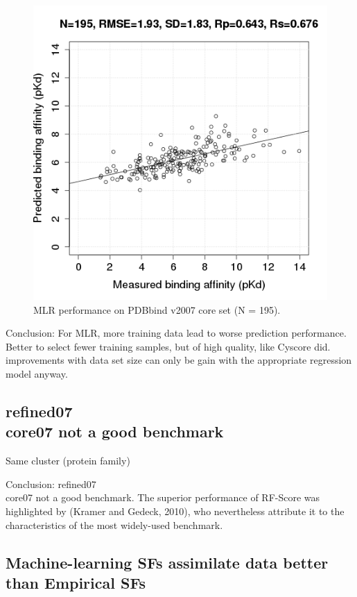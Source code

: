 \documentclass[journal=jacsat,manuscript=article]{achemso}
\begin{document}
\begin{figure}
\endminipage\hfill
{}%
\includegraphics[width=1.4\linewidth,natwidth=480,natheight=480]{../rfcyscore/x4/mlr/trn-2280-tst-195-yp.png}
\endminipage
\caption{MLR performance on PDBbind v2007 core set (N = 195).}
\label{fig:mlr-tst-195}
\end{figure}

Conclusion: For MLR, more training data lead to worse prediction performance. Better to select fewer training samples, but of high quality, like Cyscore did.
improvements with data set size can only be gain with the appropriate regression model anyway.

\subsection{refined07\\core07 not a good benchmark}

Same cluster (protein family)

Conclusion: refined07\\core07 not a good benchmark.
The superior performance of RF-Score was highlighted by (Kramer and Gedeck, 2010), who nevertheless attribute it to the characteristics of the most widely-used benchmark. \cite{774}


\subsection{Machine-learning SFs assimilate data better than Empirical SFs}
\end{document}
